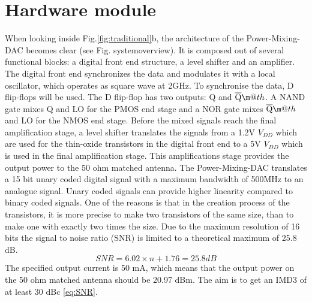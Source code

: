 \makeatletter
\newcommand*{\textoverline}[1]{$\overline{\hbox{#1}}\m@th$}
\makeatother

\section{Hardware module}\label{sec:overview}
When looking inside Fig.\ref{fig:traditional}b, the architecture of the Power-Mixing-DAC becomes clear (see Fig. systemoverview). It is composed out of several functional blocks: a digital front end structure, a level shifter and an amplifier. 
The digital front end synchronizes the data and modulates it with a local oscillator, which operates as square wave at 2GHz. To synchronise the data, D flip-flops will be used. The D flip-flop has two outputs: Q and \textoverline{Q}. A NAND gate mixes Q and LO for the PMOS end stage and a NOR gate mixes \textoverline{Q} and LO for the NMOS end stage. Before the mixed signals reach the final amplification stage, a level shifter translates the signals from a 1.2V $V_{DD}$ which are used for the thin-oxide transistors in the digital front end to a 5V $V_{DD}$ which is used in the final amplification stage. This amplifications stage provides the output power to the 50 ohm matched antenna.
The Power-Mixing-DAC translates a 15 bit unary coded digital signal with a maximum bandwidth of 500MHz to an analogue signal. Unary coded  signals can provide higher linearity compared to binary coded signals. One of the reasons is that in the creation process of the transistors, it is more precise to make two transistors of the same size, than to make one with exactly two times the size. Due to the maximum resolution of 16 bits the signal to noise ratio (SNR) is limited to a theoretical maximum of 25.8 dB.
\begin{equation}\label{eq:SNR}{SNR = 6.02 \times n + 1.76 = 25.8 dB}\end{equation}
The specified output current is 50 mA, which means that the output power on the 50 ohm matched antenna should be 20.97 dBm. The aim is to get an IMD3 of at least 30 dBc \ref{eq:SNR}.
